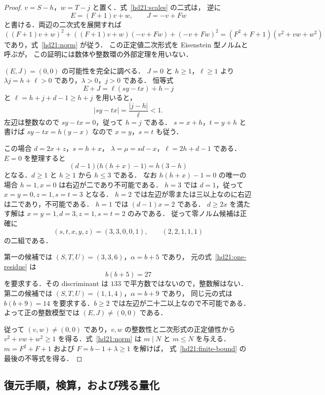 \begin{proof}
$v=S-h$，$w=T-j$ と置く．式~\eqref{hd21:scales} の二式は，
逆に
\begin{equation}\label{hd21:norm-linear}
 E=(F+1)v+w,\qquad J=-v+Fw
\end{equation}
と書ける．両辺の二次式を展開すれば
\[
 ((F+1)v+w)^2+((F+1)v+w)(-v+Fw)+(-v+Fw)^2
 =(F^2+F+1)(v^2+vw+w^2)
\]
であり，式~\eqref{hd21:norm} が従う．
この正定値二次形式を Eisenstein 型ノルムと呼ぶが，
この証明には数体や整数環の外部定理を用いない．

$(E,J)=(0,0)$ の可能性を完全に調べる．
$J=0$ と $h\ge1$，$\ell\ge1$ より
$\lambda j=h+\ell>0$ であり，$\lambda>0$，$j>0$ である．
恒等式
\begin{equation}\label{hd21:zero-norm-identity}
 E+J=\ell(sy-tx)+h-j
\end{equation}
と $\ell=h+j+d-1\ge h+j$ を用いると，
\[
 |sy-tx|=\frac{|j-h|}{\ell}<1.
\]
左辺は整数なので $sy-tx=0$，従って $h=j$ である．
$s=x+h$，$t=y+h$ と書けば
$sy-tx=h(y-x)$ なので $x=y$，$s=t$ も従う．

この場合 $d=2x+z$，$s=h+x$，
$\lambda=\mu=sd-x$，$\ell=2h+d-1$ である．
$E=0$ を整理すると
\begin{equation}\label{hd21:zero-norm-classification}
 (d-1)\bigl(h(h+x)-1\bigr)=h(3-h)
\end{equation}
となる．$d\ge1$ と $h\ge1$ から $h\le3$ である．
なお $h(h+x)-1=0$ の唯一の場合 $h=1,x=0$ は右辺が二であり不可能である．
$h=3$ では $d=1$，従って $x=y=0,z=1,s=t=3$ となる．
$h=2$ では左辺が零または三以上なのに右辺は二であり，不可能である．
$h=1$ では $(d-1)x=2$ である．
$d\ge2x$ を満たす解は $x=y=1,d=3,z=1,s=t=2$ のみである．
従って零ノルム候補は正確に
\[
 (s,t,x,y,z)=(3,3,0,0,1),\qquad (2,2,1,1,1)
\]
の二組である．

第一の候補では $(S,T,U)=(3,3,6)$，$\alpha=b+5$ であり，
元の式~\eqref{hd21:one-residue} は
\[
 b(b+5)=27
\]
を要求する．その discriminant は $133$ で平方数ではないので，整数解はない．
第二の候補では $(S,T,U)=(1,1,4)$，$\alpha=b+9$ であり，
同じ元の式は $b(b+9)=14$ を要求する．$b\ge2$ では左辺が二十二以上なので不可能である．
よって正の整数模型では $(E,J)\ne(0,0)$ である．

従って $(v,w)\ne(0,0)$ であり，$v,w$ の整数性と二次形式の正定値性から
$v^2+vw+w^2\ge1$ を得る．式~\eqref{hd21:norm} は
$m\mid N$ と $m\le N$ を与える．
$m=F^2+F+1$ および $F=b-1+\lambda\ge1$ を解けば，
式~\eqref{hd21:finite-bound} の最後の不等式を得る．
\end{proof}

\subsection{復元手順，検算，および残る量化}

